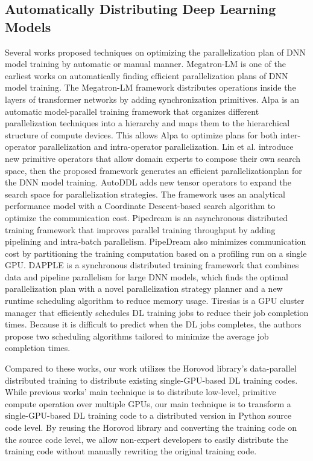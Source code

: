 \begin{inred}

\subsection{Automatically Distributing Deep Learning Models}

Several works proposed techniques on optimizing the parallelization plan of DNN model training by automatic or manual manner.
Megatron-LM \cite{megatron-lm} is one of the earliest works on automatically 
finding efficient parallelization plans of DNN model training. 
The Megatron-LM framework distributes operations inside the layers of 
transformer networks by adding synchronization primitives.
Alpa \cite{alpa} is an automatic model-parallel training framework that 
organizes different parallelization techniques into a hierarchy 
and maps them to the hierarchical structure of compute devices. 
This allows Alpa to optimize plans for both inter-operator parallelization and intra-operator parallelization.
Lin et al. \cite{nnscaler} introduce new primitive operators 
that allow domain experts to compose their own search space, 
then the proposed framework generates an efficient parallelizationplan for the DNN model training.
AutoDDL\cite{autoddl} adds new tensor operators to expand the search space for parallelization strategies. 
The framework uses an analytical performance model with a Coordinate Descent-based search algorithm to optimize the communication cost.
Pipedream \cite{pipedream} is an asynchronous distributed training framework 
that improves parallel training throughput by adding pipelining and intra-batch parallelism. 
PipeDream also minimizes communication cost by partitioning the training computation based on a profiling run on a single GPU.
DAPPLE \cite{dapple} is a synchronous distributed training framework 
that combines data and pipeline parallelism for large DNN models, 
which finds the optimal parallelization plan with a novel parallelization strategy planner 
and a new runtime scheduling algorithm to reduce memory usage.
Tiresias\cite{tiresias} is a GPU cluster manager 
that efficiently schedules DL training jobs to reduce their job completion times. 
Because it is difficult to predict when the DL jobs completes, 
the authors propose two scheduling algorithms tailored to minimize the average job completion times.

Compared to these works, our work utilizes the Horovod library’s 
data-parallel distributed training to distribute existing single-GPU-based DL training codes.
While previous works’ main technique is to distribute low-level, 
primitive compute operation over multiple GPUs, 
our main technique is to transform a single-GPU-based DL training code 
to a distributed version in Python source code level. 
By reusing the Horovod library and converting the training code on the source code level, 
we allow non-expert developers to easily distribute the training code without manually rewriting the original training code.



\end{inred}

